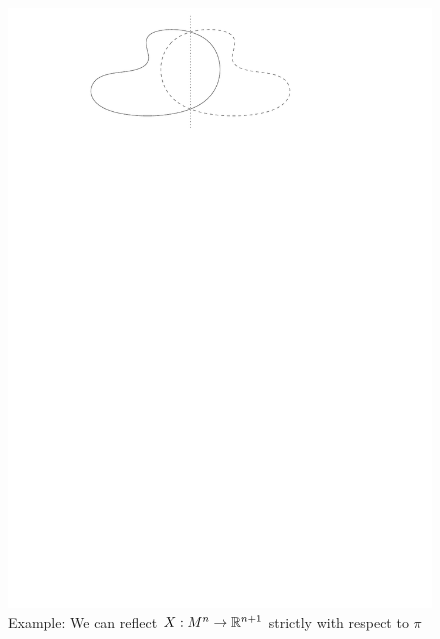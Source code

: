 \begin{figure}
	\centering
	\includegraphics[width=\textwidth]{"figures/7_reflects_strictly"}
	\caption{Example: We can reflect $X: M^n\rightarrow \mathbb{R}^{n+1}$ strictly with respect to $\pi$}
\end{figure}

